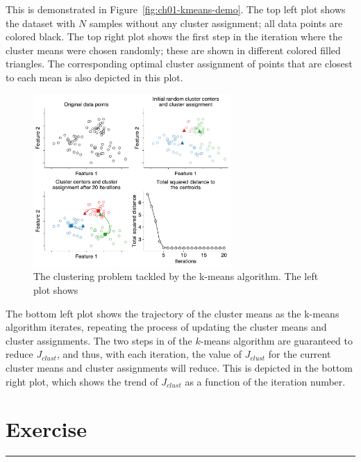 This is demonstrated in Figure~\ref{fig:ch01-kmeans-demo}. The top left plot shows the dataset with $N$ samples without any cluster assignment; all data points are colored black. The top right plot shows the first step in the iteration where the cluster means were chosen randomly; these are shown in different colored filled triangles. The corresponding optimal cluster assignment of points that are closest to each mean is also depicted in this plot.

\begin{figure}[h]
    \centering
    \includegraphics[width=0.67\textwidth]{figure/chapter01/kmeans-algo.pdf}
    \caption{The clustering problem tackled by the k-means algorithm. The left plot shows  }
    \label{fig:ch01-kmeans-algo}
\end{figure}

The bottom left plot shows the trajectory of the cluster means as the k-means algorithm iterates, repeating the process of updating the cluster means and cluster assignments. The two steps in of the $k$-means algorithm are guaranteed to reduce $J_{clust}$, and thus, with each iteration, the value of $J_{clust}$ for the current cluster means and cluster assignments will reduce. This is depicted in the bottom right plot, which shows the trend of $J_{clust}$ as a function of the iteration number.

\section{Exercise}
\vspace{-0.5cm}
\begin{center}
    \rule{\textwidth}{1pt}
\end{center}

